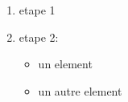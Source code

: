 \documentclass{article}
\begin{document}
	\begin{enumerate}
		\item etape 1
		\item etape 2:
		\begin{itemize}
			\item un element
			\item un autre element
		\end{itemize}
	\end{enumerate}
\end{document}
